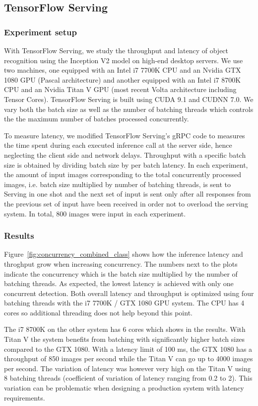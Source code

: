 \documentclass[sigconf]{acmart}
\begin{document}
\subsection{TensorFlow Serving}\subsubsection{Experiment setup}
With TensorFlow Serving, we study the throughput and latency of object recognition using the Inception V2 model on high-end desktop servers. We use two machines, one equipped with an Intel i7 7700K CPU and an Nvidia GTX 1080 GPU (Pascal architecture) and another equipped with an Intel i7 8700K CPU and an Nvidia Titan V GPU (most recent Volta architecture including Tensor Cores). TensorFlow Serving is built using CUDA 9.1 and CUDNN 7.0. We vary both the batch size as well as the number of batching threads which controls the the maximum number of batches processed concurrently.

To measure latency, we modified TensorFlow Serving's gRPC code to measures the time spent during each executed inference call at the server side, hence neglecting the client side and network delays. Throughput with a specific batch size is obtained by dividing batch size by per batch latency. In each experiment, the amount of input images corresponding to the total concurrently processed images, i.e. batch size multiplied by number of batching threads, is sent to Serving in one shot and the next set of input is sent only after all responses from the previous set of input have been received in order not to overload the serving system. In total, 800 images were input in each experiment.

\subsubsection{Results}
Figure~\ref{fig:concurrency_combined_class} shows how the inference latency and throghput grow when increasing concurrency. The numbers next to the plots indicate the concurrency which is the batch size multiplied by the number of batching threads. As expected, the lowest latency is achieved with only one concurrent detection. Both overall latency and throughput is optimized using four batching threads with the i7 7700K / GTX 1080 GPU system. The CPU has 4 cores so additional threading does not help beyond this point.

The i7 8700K on the other system has 6 cores which shows in the results. With Titan V the system benefits from batching with significantly higher batch sizes compared to the GTX 1080. With a latency limit of 100 ms, the GTX 1080 has a throughput of 850 images per second while the Titan V can go up to 4000 images per second. The variation of latency was however very high on the Titan V using 8 batching threads (coefficient of variation of latency ranging from 0.2 to 2). This variation can be problematic when designing a production system with latency requirements.
\end{document}
